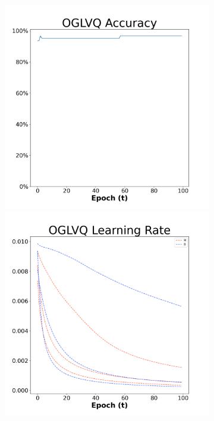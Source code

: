 \begin{figure}[H]
    \centering %
\begin{subfigure}{0.3\textwidth}
  \includegraphics[width=\linewidth]{images/exper1/breast/OGLVQ_0.01_acc.png}
    \includegraphics[width=\linewidth]{images/exper1/breast/OGLVQ_0.01_lr.png}

\end{subfigure}
\end{figure}
